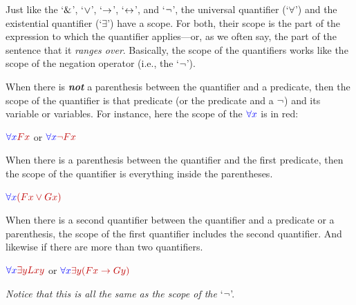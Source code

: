 Just like the `$\mathbin{\&}$', `$\vee$', `$\rightarrow$', `$\leftrightarrow$', and `${\neg}$', the universal quantifier (`$\forall$’) and the existential quantifier (`$\exists$’) have a scope. For both, their scope is the part of the expression to which the quantifier applies---or, as we often say, the part of the sentence that it \textit{ranges over}. Basically, the scope of the quantifiers works like the scope of the negation operator (i.e., the `${\neg}$’). 

\begin{ebullet}
\item[(1)] When there is \textit\textbf{not} a parenthesis between the quantifier and a predicate, then the scope of the quantifier is that predicate (or the predicate and a ${\neg}$) and its variable or variables. For instance, here the scope of the $\color{blue}{\forall x}$ is in red:
\begin{earg}
\item[] $\color{blue}{\forall x} \color{red2}{Fx}$ or $\color{blue}{\forall x} \color{red2}{\enot Fx}$ 
\end{earg}
\smallskip

\item[(2)] When there is a parenthesis between the quantifier and the first predicate, then the scope of the quantifier is everything inside the parentheses.
\begin{earg}
\item[] $\color{blue}{\forall x} \color{red2}{(Fx \eor Gx)}$ 
\end{earg}
\smallskip

\item[(3)] When there is a second quantifier between the quantifier and a predicate or a parenthesis, the scope of the first quantifier includes the second quantifier. And likewise if there are more than two quantifiers.
\begin{earg}
\item[] $\color{blue}{\forall x} \color{red2}{\exists yLxy}$ or $\color{blue}{\forall x} \color{red2}{\exists y(Fx \eif Gy)}$
\end{earg}
\smallskip
\item[] \textit{Notice that this is all the same as the scope of the} `${\neg}$’.
\end{ebullet}
